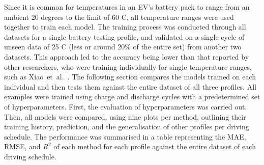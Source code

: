 %
Since it is common for temperatures in an EV's battery pack to range from an ambient 20 degrees to the limit of 60 \textdegree{}C, all temperature ranges were used together to train each model.
The training process was conducted through all datasets for a single battery testing profile, and validated on a single cycle of unseen data of 25 \textdegree{}C (less or around 20\% of the entire set) from another two datasets.
This approach led to the accuracy being lower than that reported by other researchers, who were training individually for single temperature ranges, such as \mbox{Xiao et al.~\cite{xiao_accurate_2019}}.
The following section compares the models trained on each individual and then tests them against the entire dataset of all three profiles.
All examples were trained using charge and discharge cycles with a predetermined set of hyperparameters.
First, the evaluation of hyperparameters was carried out.
Then, all models were compared, using nine plots per method, outlining their training history, prediction, and the generalisation of other profiles per driving schedule.
The performance was summarised in a table representing the MAE, RMSE, and $R^2$ of each method for each profile against the entire dataset of each driving schedule.
%

